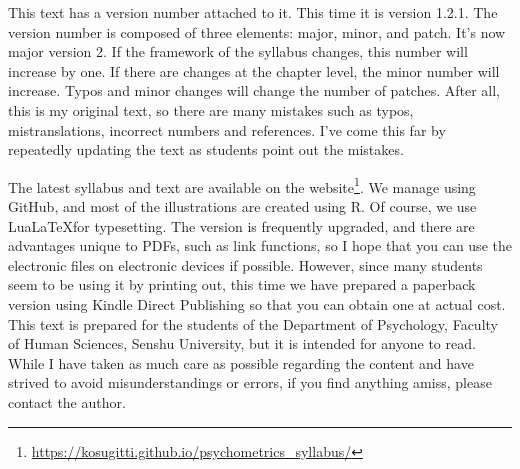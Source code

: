 This text has a version number attached to it. This time it is version 1.2.1. The version number is composed of three elements: major, minor, and patch.
It's now major version 2.
If the framework of the syllabus changes, this number will increase by one.
If there are changes at the chapter level, the minor number will increase.
Typos and minor changes will change the number of patches.
After all, this is my original text, so there are many mistakes such as typos, mistranslations, incorrect numbers and references. I've come this far by repeatedly updating the text as students point out the mistakes.



The latest syllabus and text are available on the website\footnote{\url{https://kosugitti.github.io/psychometrics_syllabus/}}.
We manage using GitHub, and most of the illustrations are created using R. Of course, we use Lua\LaTeX for typesetting.
The version is frequently upgraded, and there are advantages unique to PDFs, such as link functions, so I hope that you can use the electronic files on electronic devices if possible.
However, since many students seem to be using it by printing out, this time we have prepared a paperback version using Kindle Direct Publishing so that you can obtain one at actual cost.
This text is prepared for the students of the Department of Psychology, Faculty of Human Sciences, Senshu University, but it is intended for anyone to read. While I have taken as much care as possible regarding the content and have strived to avoid misunderstandings or errors, if you find anything amiss, please contact the author.

